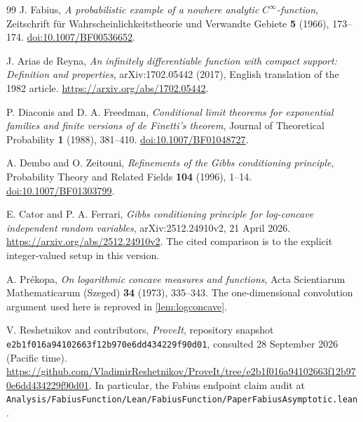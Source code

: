 \documentclass[11pt,a4paper]{article}
\numberwithin{equation}{section}
\theoremstyle{definition}
\theoremstyle{remark}
\begin{document}
\begin{thebibliography}{99}
J. Fabius,
\emph{A probabilistic example of a nowhere analytic
$C^\infty$-function},
Zeitschrift f\"ur Wahrscheinlichkeitstheorie und Verwandte Gebiete
\textbf{5} (1966), 173--174.
\href{https://doi.org/10.1007/BF00536652}{doi:10.1007/BF00536652}.

J. Arias de Reyna,
\emph{An infinitely differentiable function with compact support:
Definition and properties},
arXiv:1702.05442 (2017), English translation of the 1982 article.
\url{https://arxiv.org/abs/1702.05442}.

P. Diaconis and D. A. Freedman,
\emph{Conditional limit theorems for exponential families and finite
versions of de Finetti's theorem},
Journal of Theoretical Probability \textbf{1} (1988), 381--410.
\href{https://doi.org/10.1007/BF01048727}{doi:10.1007/BF01048727}.

A. Dembo and O. Zeitouni,
\emph{Refinements of the Gibbs conditioning principle},
Probability Theory and Related Fields \textbf{104} (1996), 1--14.
\href{https://doi.org/10.1007/BF01303799}{doi:10.1007/BF01303799}.

E. Cator and P. A. Ferrari,
\emph{Gibbs conditioning principle for log-concave independent
random variables}, arXiv:2512.24910v2, 21 April 2026.
\url{https://arxiv.org/abs/2512.24910v2}.
The cited comparison is to the explicit integer-valued setup in
this version.

A. Pr\'ekopa,
\emph{On logarithmic concave measures and functions},
Acta Scientiarum Mathematicarum (Szeged) \textbf{34} (1973),
335--343. The one-dimensional convolution argument used here is
reproved in \cref{lem:logconcave}.

V. Reshetnikov and contributors,
\emph{ProveIt}, repository snapshot
\nolinkurl{e2b1f016a94102663f12b970e6dd434229f90d01},
consulted 28 September 2026 (Pacific time).
\url{https://github.com/VladimirReshetnikov/ProveIt/tree/e2b1f016a94102663f12b970e6dd434229f90d01}.
In particular, the Fabius endpoint claim audit at
\nolinkurl{Analysis/FabiusFunction/Lean/FabiusFunction/PaperFabiusAsymptotic.lean}.
\end{thebibliography}
\end{document}
